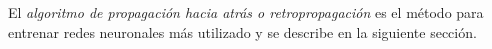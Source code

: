 El \textit{algoritmo de propagación hacia atrás o retropropagación} es el método
para entrenar redes neuronales más utilizado y se describe en la siguiente sección.








